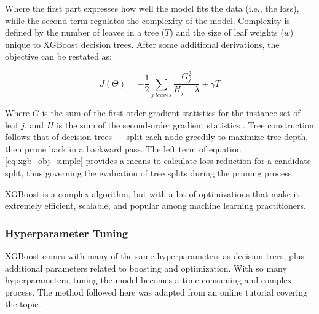 Where the first part expresses how well the model fits the data (i.e., the loss), while the second term regulates the complexity of the model. Complexity is defined by the number of leaves in a tree ($T$) and the size of leaf weights ($w$) unique to XGBoost decision trees. After some additional derivations, the objective can be restated as: 

\begin{equation}
\label{eq:xgb_obj_simple}
    J(\Theta) = -\frac{1}{2}\sum_{j\;leaves}{\frac{G_j^2}{H_j + \lambda} + \gamma T}
\end{equation}

Where $G$ is the sum of the first-order gradient statistics for the instance set of leaf $j$, and $H$ is the sum of the second-order gradient statistics \citep{chen_xgboost_2016}. Tree construction follows that of decision trees --- split each node greedily to maximize tree depth, then prune back in a backward pass. The left term of equation \ref{eq:xgb_obj_simple} provides a means to calculate loss reduction for a candidate split, thus governing the evaluation of tree splits during the pruning process. 

XGBoost is a complex algorithm, but with a lot of optimizations that make it extremely efficient, scalable, and popular among machine learning practitioners.

\subsubsection{Hyperparameter Tuning}
XGBoost comes with many of the same hyperparameters as decision trees, plus additional parameters related to boosting and optimization. With so many hyperparameters, tuning the model becomes a time-consuming and complex process. The method followed here was adapted from an online tutorial covering the topic \citep{jain_xgboost_2016}.

